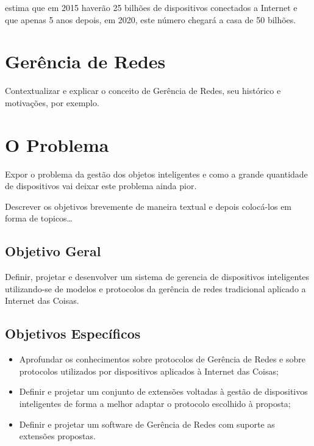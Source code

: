 \documentclass[twoside,english,brazilian]{UNISINOSmonografia}
\begin{document}
		
		
		
		 estima que em 2015 haverão 25 bilhões de dispositivos conectados a Internet e que apenas 5 anos depois, em 2020, este número chegará a casa de 50 bilhões.
		
		
		
	

	\section{Gerência de Redes}
	
		Contextualizar e explicar o conceito de Gerência de Redes, seu 
		histórico
		e motivações, por exemplo.


\section{O Problema}

	Expor o problema da gestão dos objetos inteligentes e como a grande 
	quantidade
	de dispositivos vai deixar este problema ainda pior.
		
	Descrever os objetivos brevemente de maneira textual e depois colocá-los em
	forma de topicos\ldots


	\subsection{Objetivo Geral}
	
		Definir, projetar e desenvolver um sistema de gerencia de dispositivos 
		inteligentes utilizando-se de modelos e protocolos da gerência de 
		redes 
		tradicional aplicado a Internet das Coisas.
	
	
	\subsection{Objetivos Específicos}
	
		\begin{itemize}
			\item 
				Aprofundar os conhecimentos sobre protocolos de Gerência de 
				Redes 
				e sobre protocolos utilizados por dispositivos aplicados à 
				Internet das Coisas;
				
			\item
				Definir e projetar um conjunto de extensões voltadas à gestão 
				de dispositivos inteligentes de forma a melhor adaptar o 
				protocolo escolhido à proposta;
				
			\item
				Definir e projetar um software de Gerência de Redes com 
				suporte 
				as extensões propostas.
				
		\end{itemize}
\end{document}
